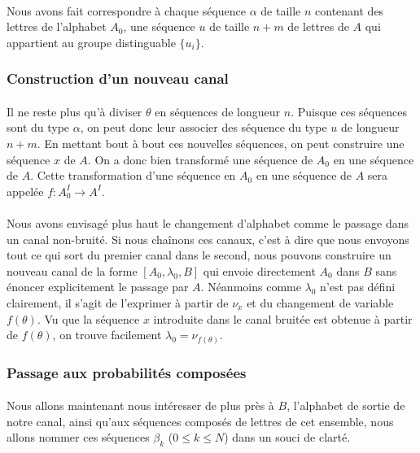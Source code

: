 	\paragraph{}
	Nous avons fait correspondre à chaque séquence $\alpha$ de taille $n$ 
	contenant des lettres de l'alphabet $A_0$, une séquence $u$ de taille
	$n+m$ de lettres de $A$ qui appartient au groupe distinguable $\{u_i\}$. 
	
\subsubsection*{Construction d'un nouveau canal}
	
	\paragraph{}
	Il ne reste plus qu'à diviser $\theta$ en séquences de longueur $n$. 
	Puisque ces séquences sont du type $\alpha$, on peut donc leur 
	associer des séquence du type $u$ de longueur $n+m$. En mettant bout à bout
	ces nouvelles séquences, on peut construire une séquence $x$ de $A$. 
	On a donc bien transformé une séquence de $A_0$ en une séquence de $A$. 
	Cette transformation d'une séquence en $A_0$ en une séquence de $A$ sera 
	appelée $f : A_0^I \to A^I$.
	
	\paragraph{}
	Nous avons envisagé plus haut le changement
	d'alphabet comme le passage dans un canal non-bruité. Si nous chaînons 
	ces canaux, c'est à dire que nous envoyons tout ce qui sort du premier 
	canal dans le second, nous pouvons construire un nouveau canal de la 
	forme $[A_0,\lambda_0,B]$ qui envoie directement $A_0$ dans $B$ 
	sans énoncer explicitement le passage par $A$. Néanmoins comme
	$\lambda_0$ n'est pas défini clairement, il s'agit de l'exprimer à partir 
	de $\nu_x$ et du changement de variable $f(\theta)$. 
	Vu que la séquence $x$ introduite dans le canal bruitée est obtenue à 
	partir de $f(\theta)$, on trouve facilement $\lambda_0=\nu_{f(\theta)}$.
	
\subsubsection*{Passage aux probabilités composées}
	
	\paragraph{}
	Nous allons maintenant nous intéresser de plus près à $B$, l'alphabet 
	de sortie de notre canal, ainsi qu'aux séquences composés de lettres de cet
	ensemble, nous allons nommer ces séquences $\beta_k$ ($0 \le k \le N$) dans
	un souci de clarté.
	
